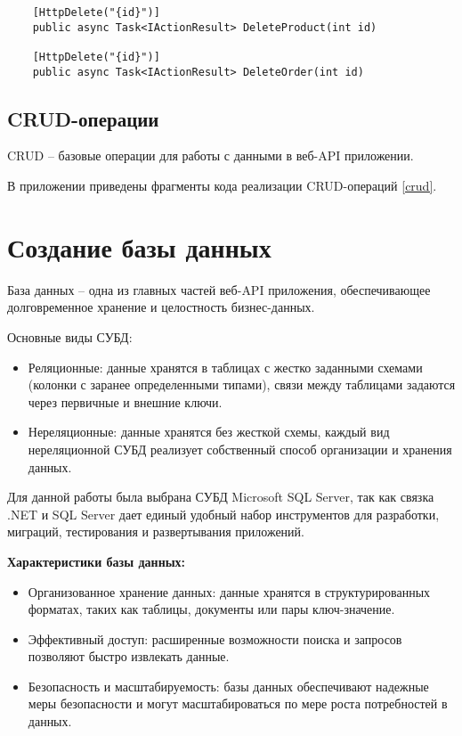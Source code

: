 \documentclass[a4paper,12pt]{report}
\begin{document}
\begin{verbatim}
    [HttpDelete("{id}")]
    public async Task<IActionResult> DeleteProduct(int id)

    [HttpDelete("{id}")]
    public async Task<IActionResult> DeleteOrder(int id)
\end{verbatim}

\subsection{\acs{CRUD}-операции}

\acs{CRUD} -- базовые операции для работы с данными в веб-\acs{API} приложении.

В приложении приведены фрагменты кода реализации \acs{CRUD}-операций \ref{crud}.

\section{Создание базы данных}

База данных -- одна из главных частей веб-\acs{API} приложения, 
обеспечивающее долговременное хранение и целостность бизнес-данных.

Основные виды \acs{СУБД}:
\begin{itemize}
    \item
        Реляционные: данные хранятся в таблицах с жестко заданными схемами 
        (колонки с заранее определенными типами), связи между таблицами 
        задаются через первичные и внешние ключи.
    \item
        Нереляционные: данные хранятся без жесткой схемы, каждый вид 
        нереляционной \acs{СУБД} реализует собственный способ организации и хранения данных.
\end{itemize}

Для данной работы была выбрана \acs{СУБД} Microsoft SQL Server, 
так как связка .NET и SQL Server дает единый удобный набор 
инструментов для разработки, миграций, тестирования и развертывания приложений.

\textbf{Характеристики базы данных:}
\begin{itemize}
    \item
        Организованное хранение данных: данные хранятся в структурированных 
        форматах, таких как таблицы, документы или пары ключ-значение.
    \item
        Эффективный доступ: расширенные возможности поиска и запросов позволяют быстро извлекать данные.
    \item
        Безопасность и масштабируемость: базы данных обеспечивают надежные меры 
        безопасности и могут масштабироваться по мере роста потребностей в данных.\cite{database}
\end{itemize}
\end{document}
